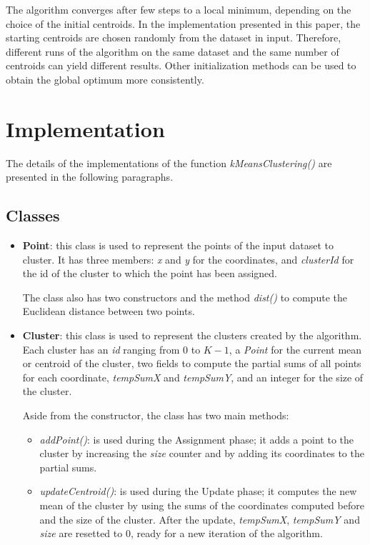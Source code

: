 \documentclass[10pt,twocolumn,letterpaper]{article}
\begin{document}
The algorithm converges after few steps to a local minimum, depending on the choice of the initial centroids. In the implementation presented in this paper, the starting centroids are chosen randomly from the dataset in input. Therefore, different runs of the algorithm on the same dataset and the same number of centroids can yield different results. Other initialization methods can be used to obtain the global optimum more consistently.


\section{Implementation}
The details of the implementations of the function \textit{kMeansClustering()} are presented in the following paragraphs.

\subsection{Classes}
\begin{itemize}
	\item \textbf{Point}: this class is used to represent the points of the input dataset to cluster. It has three members: \textit{x} and \textit{y} for the coordinates, and \textit{clusterId} for the id of the cluster to which the point has been assigned. 
	
	The class also has two constructors and the method \textit{dist()} to compute the Euclidean distance between two points.
	
	\item \textbf{Cluster}: this class is used to represent the clusters created by the algorithm. Each cluster has an \textit{id} ranging from 0 to $K - 1$, a \textit{Point} for the current mean or centroid of the cluster, two fields to compute the partial sums of all points for each coordinate, \textit{tempSumX} and \textit{tempSumY}, and an integer for the size of the cluster.
	
	Aside from the constructor, the class has two main methods:
	\begin{itemize}
		\item \textit{addPoint()}: is used during the Assignment phase; it adds a point to the cluster by increasing the \textit{size} counter and by adding its coordinates to the partial sums.
		\item \textit{updateCentroid()}: is used during the Update phase; it computes the new mean of the cluster by using the sums of the coordinates computed before and the size of the cluster. After the update, \textit{tempSumX}, \textit{tempSumY} and \textit{size} are resetted to 0, ready for a new iteration of the algorithm.
	\end{itemize}
\end{itemize}
\end{document}
